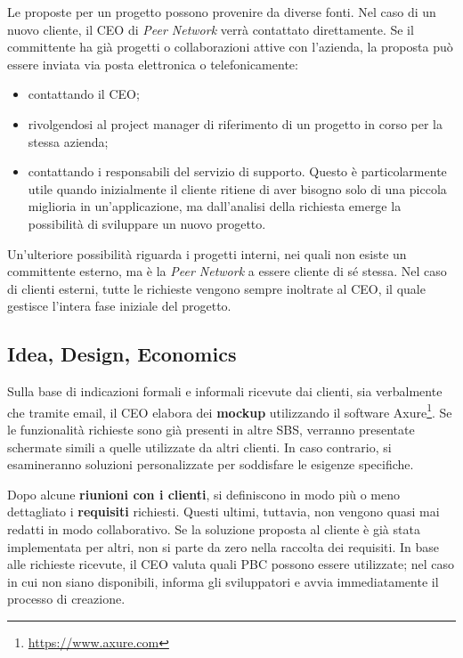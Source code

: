 Le proposte per un progetto possono provenire da diverse fonti. Nel caso di un nuovo cliente, il CEO di \textit{Peer Network} verrà contattato direttamente.
Se il committente ha già progetti o collaborazioni attive con l’azienda, la proposta può essere inviata via posta elettronica o telefonicamente:
\begin{itemize}
    \item contattando il CEO;
    \item rivolgendosi al project manager di riferimento di un progetto in corso per la stessa azienda;
    \item contattando i responsabili del servizio di supporto. Questo è particolarmente utile quando inizialmente 
    il cliente ritiene di aver bisogno solo di una piccola miglioria in un'applicazione, ma dall'analisi della
    richiesta emerge la possibilità di sviluppare un nuovo progetto.
\end{itemize}

Un'ulteriore possibilità riguarda i progetti interni, nei quali non esiste un committente esterno, ma è la \textit{Peer Network} a essere cliente di sé stessa.
Nel caso di clienti esterni, tutte le richieste vengono sempre inoltrate al CEO, il quale gestisce l'intera fase iniziale del progetto.

    \subsection{Idea, Design, Economics}
    Sulla base di indicazioni formali e informali ricevute dai clienti, sia verbalmente che tramite email, il
    CEO elabora dei \textbf{mockup} utilizzando il software Axure\footnote{\url{https://www.axure.com}}. Se le funzionalità richieste sono già presenti in altre
    \ac{SBS}, verranno presentate schermate simili a quelle utilizzate da altri clienti. In caso contrario,
    si esamineranno soluzioni personalizzate per soddisfare le esigenze specifiche.

    Dopo alcune \textbf{riunioni con i clienti}, si definiscono in modo più o meno dettagliato i \textbf{requisiti} richiesti. Questi ultimi,
    tuttavia, non vengono quasi mai redatti in modo collaborativo. Se la soluzione proposta al cliente è già stata
    implementata per altri, non si parte da zero nella raccolta dei requisiti. In base alle richieste ricevute, il CEO
    valuta quali \ac{PBC} possono essere utilizzate; nel caso in cui non siano disponibili, informa gli sviluppatori e avvia
    immediatamente il processo di creazione.

